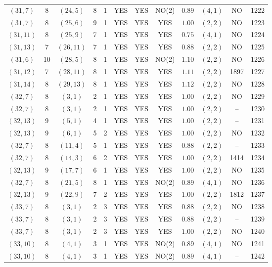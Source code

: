 \begin{longtable}{|c|c|c|c|c|c|c|c|c|c|c|c|}
$(31,7)$ & 8 & $(24,5)$ & 8 & 1 & YES & YES & NO(2) & $0.89$ & $(4,1)$ & NO & 1222\\
$(31,7)$ & 8 & $(25,6)$ & 9 & 1 & YES & YES & YES & $1.00$ & $(2,2)$ & NO & 1223\\
$(31,11)$ & 8 & $(25,9)$ & 7 & 1 & YES & YES & YES & $0.75$ & $(4,1)$ & NO & 1224\\
$(31,13)$ & 7 & $(26,11)$ & 7 & 1 & YES & YES & YES & $0.88$ & $(2,2)$ & NO & 1225\\
$(31,6)$ & 10 & $(28,5)$ & 8 & 1 & YES & YES & NO(2) & $1.10$ & $(2,2)$ & NO & 1226\\
$(31,12)$ & 7 & $(28,11)$ & 8 & 1 & YES & YES & YES & $1.11$ & $(2,2)$ & 1897 & 1227\\
$(31,14)$ & 8 & $(29,13)$ & 8 & 1 & YES & YES & YES & $1.12$ & $(2,2)$ & NO & 1228\\
$(32,7)$ & 8 & $(3,1)$ & 2 & 1 & YES & YES & YES & $1.00$ & $(2,2)$ & NO & 1229\\
$(32,7)$ & 8 & $(3,1)$ & 2 & 1 & YES & YES & YES & $1.00$ & $(2,2)$ & -- & 1230\\
$(32,13)$ & 9 & $(5,1)$ & 4 & 1 & YES & YES & YES & $1.00$ & $(2,2)$ & -- & 1231\\
$(32,13)$ & 9 & $(6,1)$ & 5 & 2 & YES & YES & YES & $1.00$ & $(2,2)$ & NO & 1232\\
$(32,7)$ & 8 & $(11,4)$ & 5 & 1 & YES & YES & YES & $0.88$ & $(2,2)$ & -- & 1233\\
$(32,7)$ & 8 & $(14,3)$ & 6 & 2 & YES & YES & YES & $1.00$ & $(2,2)$ & 1414 & 1234\\
$(32,13)$ & 9 & $(17,7)$ & 6 & 1 & YES & YES & YES & $1.00$ & $(2,2)$ & NO & 1235\\
$(32,7)$ & 8 & $(21,5)$ & 8 & 1 & YES & YES & NO(2) & $0.89$ & $(4,1)$ & NO & 1236\\
$(32,13)$ & 9 & $(22,9)$ & 7 & 2 & YES & YES & YES & $1.00$ & $(2,2)$ & 1812 & 1237\\
$(33,7)$ & 8 & $(3,1)$ & 2 & 3 & YES & YES & YES & $0.88$ & $(2,2)$ & NO & 1238\\
$(33,7)$ & 8 & $(3,1)$ & 2 & 3 & YES & YES & YES & $0.88$ & $(2,2)$ & -- & 1239\\
$(33,7)$ & 8 & $(3,1)$ & 2 & 3 & YES & YES & YES & $1.00$ & $(2,2)$ & NO & 1240\\
$(33,10)$ & 8 & $(4,1)$ & 3 & 1 & YES & YES & NO(2) & $0.89$ & $(4,1)$ & NO & 1241\\
$(33,10)$ & 8 & $(4,1)$ & 3 & 1 & YES & YES & NO(2) & $0.89$ & $(4,1)$ & -- & 1242\\

\end{longtable}
